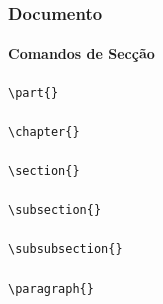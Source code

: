 \begin{frame}[fragile]
\frametitle{Documento}
\framesubtitle{Comandos de Secção}
  
\begin{verbatim}
\part{}

\chapter{}

\section{}

\subsection{}

\subsubsection{}

\paragraph{}
\end{verbatim}

\end{frame}



